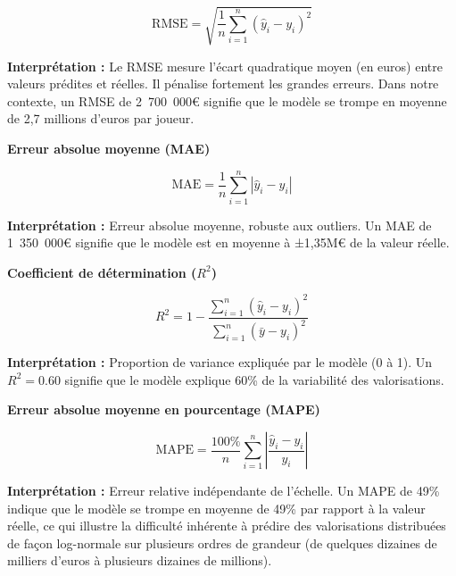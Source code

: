 \documentclass[12pt,a4paper]{article}
\begin{document}
\begin{tcolorbox}[colback=lightgray,colframe=maincolor,width=\textwidth,arc=2mm,boxrule=0.8pt]
\[
\text{RMSE} = \sqrt{\frac{1}{n} \sum_{i=1}^{n} (\hat{y}_i - y_i)^2}
\]
\end{tcolorbox}

\textbf{Interprétation :} Le RMSE mesure l'écart quadratique moyen (en euros) entre
valeurs prédites et réelles. Il pénalise fortement les grandes erreurs. Dans notre
contexte, un RMSE de 2~700~000€ signifie que le modèle se trompe en moyenne de 2,7
millions d'euros par joueur.

\textbf{Erreur absolue moyenne (MAE)}

\begin{tcolorbox}[colback=lightgray,colframe=maincolor,width=\textwidth,arc=2mm,boxrule=0.8pt]
\[
\text{MAE} = \frac{1}{n} \sum_{i=1}^{n} |\hat{y}_i - y_i|
\]
\end{tcolorbox}

\textbf{Interprétation :} Erreur absolue moyenne, robuste aux outliers.
Un MAE de 1~350~000€ signifie que le modèle est en moyenne à ±1,35M€ de la valeur
réelle.

\textbf{Coefficient de détermination ($R^2$)}

\begin{tcolorbox}[colback=lightgray,colframe=maincolor,width=\textwidth,arc=2mm,boxrule=0.8pt]
\[
R^2 = 1 - \frac{\sum_{i=1}^{n}(\hat{y}_i - y_i)^2}{\sum_{i=1}^{n}(\bar{y} - y_i)^2}
\]
\end{tcolorbox}

\textbf{Interprétation :} Proportion de variance expliquée par le modèle (0 à 1).
Un $R^2 = 0.60$ signifie que le modèle explique 60\% de la variabilité des
valorisations.

\textbf{Erreur absolue moyenne en pourcentage (MAPE)}

\begin{tcolorbox}[colback=lightgray,colframe=maincolor,width=\textwidth,arc=2mm,boxrule=0.8pt]
\[
\text{MAPE} = \frac{100\%}{n} \sum_{i=1}^{n} \left|\frac{\hat{y}_i - y_i}{y_i}\right|
\]
\end{tcolorbox}

\textbf{Interprétation :} Erreur relative indépendante de l'échelle. Un MAPE de 49\%
indique que le modèle se trompe en moyenne de 49\% par rapport à la valeur réelle,
ce qui illustre la difficulté inhérente à prédire des valorisations distribuées de
façon log-normale sur plusieurs ordres de grandeur (de quelques dizaines de milliers
d'euros à plusieurs dizaines de millions).
\end{document}
